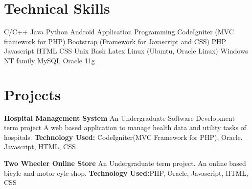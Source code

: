 \documentclass[11pt,a4paper,sans]{moderncv}
\begin{document}
\break

\section{Technical Skills}
{
C/C++
\newline Java
\newline Python
\newline Android Application Programming 
}
{
CodeIgniter (MVC framework for PHP)
\newline Bootstrap (Framework for Javascript and CSS)
\newline PHP
\newline Javascript
\newline HTML
\newline CSS
}
{
Unix Bash
\newline Latex
}
{
Linux (Ubuntu, Oracle Linux)
\newline Windows NT family
}
{
MySQL
\newline Oracle 11g
}


\section{Projects}
{
\textbf{Hospital Management System}
\newline
An Undergraduate Software Development term project \newline
A web based application to manage health data and utility tasks of hospitals.
\newline \textbf{Technology Used: } CodeIgniter(MVC Framework for PHP), Oracle, Javascript, HTML, CSS
\newline}


{
\textbf{Two Wheeler Online Store}
\newline
An Undergraduate term project. An online based bicyle and motor cyle shop.
\newline \textbf{Technology Used:}PHP, Oracle, Javascript, HTML, CSS
\newline
}
\end{document}
